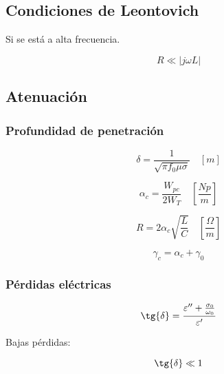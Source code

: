 \documentclass[12pt,a4paper]{article}
\begin{document}
\subsection{Condiciones de Leontovich}
\label{sub:condiciones_de_leontovich}

Si se está a alta frecuencia.

\[ R \ll |j \omega  L| \]

\subsection{Atenuación}
\label{sub:atenuacion}

\subsubsection{Profundidad de penetración}
\label{ssub:profundidad_de_penetracion}

\[ \delta = \frac{1}{\sqrt{\pi f_0 \mu \sigma}} \quad [m] \]

\[ \alpha_c = \frac{W_{pc}}{2 W_T} \quad \left[ \frac{Np}{m} \right] \]

\[ R = 2 \alpha_c \sqrt{\frac{L}{C}} \quad \left[ \frac{\Omega}{m} \right] \]

\[ \gamma_c = \alpha_c + \gamma_0 \]

\subsubsection{Pérdidas eléctricas}
\label{ssub:perdidas_electricas}

\[ \tg{\delta} = \frac{\varepsilon^{\prime\prime} + \frac{\sigma_0}{\omega_0}}{\varepsilon^{\prime}} \]

Bajas pérdidas:

\[ \tg{\delta} \ll 1 \]
\end{document}
